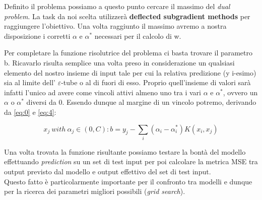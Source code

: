 \documentclass[12pt]{article}
\begin{document}
	Definito il problema possiamo a questo punto cercare il massimo del \textit{dual problem}. La task da noi scelta utilizzerà \textbf{deflected subgradient methods} per raggiungere l’obiettivo. Una volta raggiunto il massimo avremo a nostra disposizione i corretti $\alpha$ e $\alpha^*$ necessari per il calcolo di w. 

	Per completare la funzione risolutrice del problema ci basta trovare il parametro b. Ricavarlo risulta semplice una volta preso in considerazione un qualsiasi elemento del nostro insieme di input tale per cui la relativa predizione (y i-esimo) sia al limite dell’ $\varepsilon$-tube o al di fuori di esso. Proprio quell’insieme di valori sarà infatti l’unico ad avere come vincoli attivi almeno uno tra i vari $\alpha$ e $\alpha^*$, ovvero un $\alpha$ o $\alpha^*$ diversi da 0. Essendo dunque al margine di un vincolo potremo, derivando da \eqref{eq:0} e \eqref{eq:4}:

	\begin{equation}
		x_j \  with\  \alpha_j \in(0,C): b = y_j - \sum_i(\alpha_i - \alpha_i^*)K(x_i,x_j)
	\end{equation}

	Una volta trovata la funzione risultante possiamo testare la bontà del modello effettuando \textit{prediction} su un set di test input per poi calcolare la metrica MSE tra output previsto dal modello e output effettivo del set di test input.\\
Questo fatto è particolarmente importante per il confronto tra modelli e dunque per la ricerca dei parametri migliori possibili (\textit{grid search}).
\end{document}
